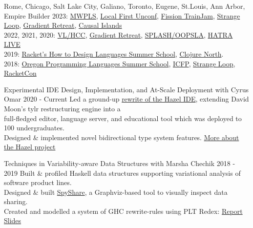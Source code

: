 \documentclass[10pt,a4paper]{article}
\begin{document}
    {Rome, Chicago, Salt Lake City, Galiano, Toronto, Eugene, St.Louis, Ann Arbor, Empire Builder}    
    {2023:
    \href{https://mwpls2023.engin.umich.edu/}{MWPLS}, 
    \href{https://lu.ma/localfirstswunconf-stlouis}{Local First Unconf},
    \href{https://talk.fission.codes/t/trainjam-2023/4789}{Fission TrainJam},
    \href{https://www.thestrangeloop.com/}{Strange Loop},
    \href{https://www.gradientretreat.com/}{Gradient Retreat}, 
    \href{https://www.causalislands.com/}{Causal Islands} \\
    2022, 2021, 2020:
    \href{https://conf.researchr.org/home/vlhcc-2022}{VL/HCC},
    \href{https://www.gradientretreat.com/}{Gradient Retreat},
    \href{https://2021.splashcon.org/track/splash-2021-oopsla}{SPLASH/OOPSLA}, 
    \href{https://2021.splashcon.org/home/hatra-2021}{HATRA} 
    \href{https://2021.splashcon.org/home/live-2021}{LIVE} \\
    2019:
    \href{https://school.racket-lang.org/2019/plan/}{Racket's How to Design Languages Summer School},
    \href{https://clojurenorth.com/}{Clojure North}. \\ 
    2018:
    \href{https://www.cs.uoregon.edu/research/summerschool/summer18/}{Oregon Programming Languages Summer School},
    \href{https://conf.researchr.org/home/icfp-2018}{ICFP},
    \href{https://www.thestrangeloop.com/2018/sessions.html}{Strange Loop},
    \href{https://con.racket-lang.org/2018/}{RacketCon}}
    

  \headedsubsection
    {Experimental IDE Design, Implementation, and At-Scale Deployment with Cyrus Omar}
    {2020 - Current}
    {Led a ground-up \href{https://hazel.org/build/haz3l-tests/}{rewrite of the Hazel IDE}, extending David Moon's tylr restructuring engine into a \\ full-fledged editor, language server, and educational tool which was deployed to 100 undergraduates.\\ Designed \& implemented novel bidirectional type system features. \href{https://hazel.org/}{More about the Hazel project}}

  \headedsubsection
    {Techniques in Variability-aware Data Structures with Marsha Chechik}
    {2018 - 2019}
    {Built \& profiled Haskell data structures supporting variational analysis of software product lines. \\
    Designed \& built \href{https://github.com/disconcision/spyshare}{SpyShare}, a Graphviz-based tool to visually inspect data sharing. \\
    Created and modelled a system of GHC rewrite-rules using PLT Redex:    \href{https://github.com/disconcision/vardatalab/blob/master/CSC495_TECHNIQUES_IN_VARIABILITY_AWARE_DATA_STRUCTURES.pdf}{Report} \sbull \href{https://github.com/disconcision/vardatalab/blob/master/CSC495_variational_data_structures_slides.pdf}{Slides}}
    
\end{document}
